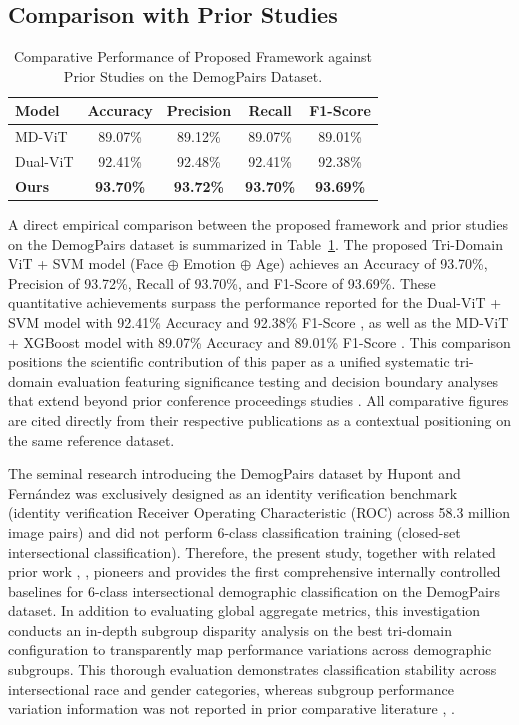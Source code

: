 \subsection{Comparison with Prior Studies}
\label{sec:comparison_prior}
\label{sec:comparison_with_prior_studies}

\begin{table}[htbp]
\caption{Comparative Performance of Proposed Framework against Prior Studies on the DemogPairs Dataset.}
\label{tab:XII}
\centering
\begin{tabular}{lcccc}
\toprule
Model & Accuracy & Precision & Recall & F1-Score \\
\midrule
MD-ViT \cite{ref20} & 89.07\% & 89.12\% & 89.07\% & 89.01\% \\
Dual-ViT \cite{ref19} & 92.41\% & 92.48\% & 92.41\% & 92.38\% \\
\textbf{Ours} & \textbf{93.70\%} & \textbf{93.72\%} & \textbf{93.70\%} & \textbf{93.69\%} \\
\bottomrule
\end{tabular}
\end{table}

A direct empirical comparison between the proposed framework and prior studies on the DemogPairs dataset is summarized in Table~\ref{tab:XII}. The proposed Tri-Domain ViT + SVM model (Face $\oplus$ Emotion $\oplus$ Age) achieves an Accuracy of 93.70\%, Precision of 93.72\%, Recall of 93.70\%, and F1-Score of 93.69\%. These quantitative achievements surpass the performance reported for the Dual-ViT + SVM model with 92.41\% Accuracy and 92.38\% F1-Score \cite{ref19}, as well as the MD-ViT + XGBoost model with 89.07\% Accuracy and 89.01\% F1-Score \cite{ref20}. This comparison positions the scientific contribution of this paper as a unified systematic tri-domain evaluation featuring significance testing and decision boundary analyses that extend beyond prior conference proceedings studies \cite{ref19}. All comparative figures are cited directly from their respective publications as a contextual positioning on the same reference dataset.

The seminal research introducing the DemogPairs dataset by Hupont and Fern{\'a}ndez \cite{ref25} was exclusively designed as an identity verification benchmark (identity verification Receiver Operating Characteristic (ROC) across 58.3 million image pairs) and did not perform 6-class classification training (closed-set intersectional classification). Therefore, the present study, together with related prior work \cite{ref19}, \cite{ref20}, pioneers and provides the first comprehensive internally controlled baselines for 6-class intersectional demographic classification on the DemogPairs dataset. In addition to evaluating global aggregate metrics, this investigation conducts an in-depth subgroup disparity analysis on the best tri-domain configuration to transparently map performance variations across demographic subgroups. This thorough evaluation demonstrates classification stability across intersectional race and gender categories, whereas subgroup performance variation information was not reported in prior comparative literature \cite{ref19}, \cite{ref20}.
